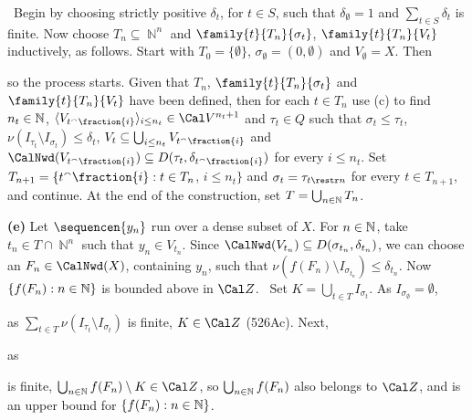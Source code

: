 {\noindent\Prf\ Begin by choosing strictly positive $\delta_t$, for
$t\in S$, such that $\delta_{\emptyset}=1$
and $\sum_{t\in S}\delta_t$ is finite.
Now choose $T_n\subseteq\BbbN^n$ and
$\family{t}{T_n}{\sigma_t}$, $\family{t}{T_n}{V_t}$
inductively, as follows.
Start with $T_0=\{\emptyset\}$,
$\sigma_{\emptyset}=(0,\emptyset)$ and $V_{\emptyset}=X$.
Then


\noindent so the process starts.
Given that $T_n$, $\family{t}{T_n}{\sigma_t}$ and
$\family{t}{T_n}{V_t}$
have been defined, then for each $t\in T_n$ use (c) to find $n_t\in\Bbb N$,
$\langle V_{t^{\smallfrown}\fraction{i}}\rangle_{i\le n_t}
\in\Cal V^{n_t+1}$
and $\tau_t\in Q$ such that $\sigma_t\le\tau_t$,
$\nu(I_{\tau_t}\setminus I_{\sigma_t})\le\delta_t$,
$V_t\subseteq\bigcup_{i\le n_t}V_{t^{\smallfrown}\fraction{i}}$
and
$\CalNwd(V_{t^{\smallfrown}\fraction{i}})
\subseteq D({\tau_t},\delta_{t^{\smallfrown}\fraction{i}})$ for every
$i\le n_t$.   Set
$T_{n+1}=\{t^{\smallfrown}\fraction{i}:t\in T_n$, $i\le n_t\}$ and
$\sigma_t=\tau_{t\restr n}$ for every $t\in T_{n+1}$, and continue.
At the end of the construction, set $T=\bigcup_{n\in\Bbb N}T_n$.\ \Qed

\medskip

{\bf (e)} Let $\sequencen{y_n}$ run over a dense subset of $X$.   For
$n\in\Bbb N$, take $t_n\in T\cap\BbbN^n$ such that
$y_n\in V_{t_n}$.   Since
$\CalNwd(V_{t_n})\subseteq D(\sigma_{t_n},\delta_{t_n})$, we can
choose an $F_n\in\CalNwd(X)$, containing $y_n$, such that
$\nu(f(F_n)\setminus I_{\sigma_{t_n}})\le\delta_{t_n}$.
Now $\{f(F_n):n\in\Bbb N\}$ is bounded above in $\Cal Z$.   \Prf\ Set
$K=\bigcup_{t\in T}I_{\sigma_t}$.   As $I_{\sigma_{\emptyset}}=\emptyset$,

\noindent as $\sum_{t\in T}\nu(I_{\tau_t}\setminus I_{\sigma_t})$ is
finite, $K\in\Cal Z$ (526Ac).   Next,


\noindent as


\noindent is finite, $\bigcup_{n\in\Bbb N}f(F_n)\setminus K\in\Cal Z$,
so $\bigcup_{n\in\Bbb N}f(F_n)$ also belongs to $\Cal Z$, and is an upper
bound for $\{f(F_n):n\in\Bbb N\}$.\ \Qed

}
